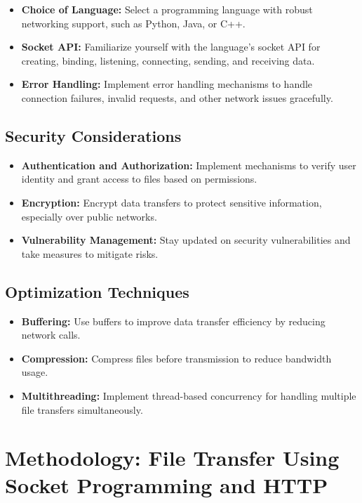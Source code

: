 \documentclass[11pt]{article}
\begin{document}
\begin{itemize}
  \item \textbf{Choice of Language:} Select a programming language with robust networking support, such as Python, Java, or C++.
  \item \textbf{Socket API:} Familiarize yourself with the language's socket API for creating, binding, listening, connecting, sending, and receiving data.
  \item \textbf{Error Handling:} Implement error handling mechanisms to handle connection failures, invalid requests, and other network issues gracefully.
\end{itemize}

\subsection{Security Considerations}

\begin{itemize}
  \item \textbf{Authentication and Authorization:} Implement mechanisms to verify user identity and grant access to files based on permissions.
  \item \textbf{Encryption:} Encrypt data transfers to protect sensitive information, especially over public networks.
  \item \textbf{Vulnerability Management:} Stay updated on security vulnerabilities and take measures to mitigate risks.
\end{itemize}

\subsection{Optimization Techniques}

\begin{itemize}
  \item \textbf{Buffering:} Use buffers to improve data transfer efficiency by reducing network calls.
  \item \textbf{Compression:} Compress files before transmission to reduce bandwidth usage.
  \item \textbf{Multithreading:} Implement thread-based concurrency for handling multiple file transfers simultaneously.
\end{itemize}

\section{Methodology: File Transfer Using Socket Programming and HTTP}
\end{document}
